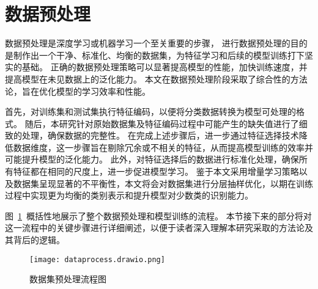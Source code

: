 \section{数据预处理}
数据预处理是深度学习或机器学习一个至关重要的步骤，
进行数据预处理的目的是制作出一个干净、标准化、均衡的数据集，为特征学习和后续的模型训练打下坚实的基础。
正确的数据预处理策略可以显著提高模型的性能，加快训练速度，并提高模型在未见数据上的泛化能力。
本文在数据预处理阶段采取了综合性的方法论，旨在优化模型的学习效率和性能。\par

首先，对训练集和测试集执行特征编码，以便将分类数据转换为模型可处理的格式。
随后，本研究针对原始数据集及特征编码过程中可能产生的缺失值进行了细致的处理，确保数据的完整性。
在完成上述步骤后，进一步通过特征选择技术降低数据维度，这一步骤旨在剔除冗余或不相关的特征，从而提高模型训练的效率并可能提升模型的泛化能力。
此外，对特征选择后的数据进行标准化处理，确保所有特征都在相同的尺度上，进一步促进模型学习。
鉴于本文采用增量学习策略以及数据集呈现显著的不平衡性，本文将会对数据集进行分层抽样优化，以期在训练过程中实现更为均衡的类别表示和提升模型对少数类的识别能力。\par

图~\ref{fig:dataprocess}~概括性地展示了整个数据预处理和模型训练的流程。
本节接下来的部分将对这一流程中的关键步骤进行详细阐述，以便于读者深入理解本研究采取的方法论及其背后的逻辑。
\begin{figure}[htbp]
  \centering
  \texttt{[image: dataprocess.drawio.png]}
  \caption{数据集预处理流程图}
  \label{fig:dataprocess}
\end{figure}


